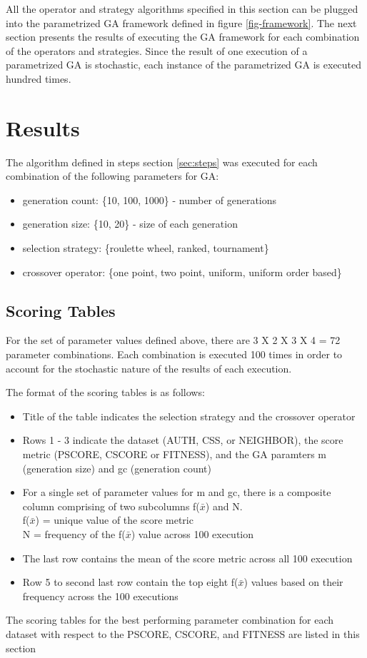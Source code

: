 \documentclass[12pt,a4paper]{article}
\begin{document}
	All the operator and strategy algorithms specified in this section can be plugged into the parametrized GA framework defined in figure \ref{fig-framework}. The next section presents the results of executing the GA framework for each combination of the operators and strategies. Since the result of one execution of a parametrized GA is stochastic, each instance of the parametrized GA is executed hundred times.
	
	\section{\large Results} \label{sec-results}
		The algorithm defined in steps section \ref{sec:steps} was executed for each combination of the following parameters for GA:
		\begin{itemize}
			\item generation count: \{10, 100, 1000\} - number of generations
			\item generation size: \{10, 20\} - size of each generation
			\item selection strategy: \{roulette wheel, ranked, tournament\}
			\item crossover operator: \{one point, two point, uniform, uniform order based\}
		\end{itemize}
 
	\subsection{Scoring Tables}
	For the set of parameter values defined above, there are 3 X 2 X 3 X 4 = 72 parameter combinations. Each combination is executed 100 times in order to account for the stochastic nature of the results of each execution. \par
	The format of the scoring tables is as follows:
	\begin{itemize}
		\item Title of the table indicates the selection strategy and the crossover operator
		\item Rows 1 - 3 indicate the dataset (AUTH, CSS, or NEIGHBOR), the score metric (PSCORE, CSCORE or FITNESS), and the GA paramters m (generation size) and gc (generation count)
		\item For a single set of parameter values for m and gc, there is a composite column comprising of two subcolumns f($\bar{x}$) and N. \\
		f($\bar{x}$) = unique value of the score metric \\
		N = frequency of the f($\bar{x}$) value across 100 execution
		\item The last row contains the mean of the score metric across all 100 execution
		\item Row 5 to second last row contain the top eight f($\bar{x}$) values based on their frequency across the 100 executions
	\end{itemize}
	The scoring tables for the best performing parameter combination for each dataset with respect to the PSCORE, CSCORE, and FITNESS are listed in this section
\end{document}
